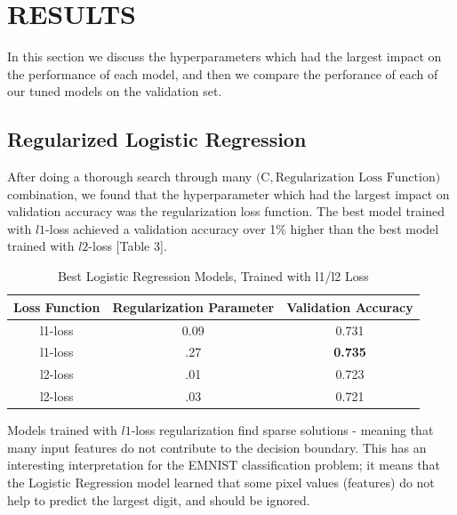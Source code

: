 \documentclass[letterpaper, 10 pt, conference]{ieeeconf}  %
\begin{document}
\section{RESULTS}

In this section we discuss the hyperparameters which had the largest impact on the performance of each model, and then we compare the perforance of each of our tuned models on the validation set. 

\subsection{Regularized Logistic Regression} 

After doing a thorough search through many $\big(\text{C}, \text{Regularization Loss Function}\big)$ combination, we found that the hyperparameter which had the largest impact on validation accuracy was the regularization loss function. The best model trained with $l1$-loss achieved a validation accuracy over 1\% higher than the best model trained with $l2$-loss [Table 3].

\begin{table}[H]
\centering
\caption{Best Logistic Regression Models, Trained with l1/l2 Loss}
\label{my-}
\begin{tabular}{|c|c|c|}
\hline
\textbf{Loss Function} & \textbf{Regularization Parameter} & \textbf{Validation Accuracy} \\ \hline
l1-loss                & 0.09                              & 0.731                        \\ \hline
l1-loss                & .27                               & \textbf{0.735}               \\ \hline
l2-loss                & .01                               & 0.723                        \\ \hline
l2-loss                & .03                               & 0.721                        \\ \hline
\end{tabular}
\end{table}

Models trained with $l1$-loss regularization find sparse solutions - meaning that many input features do not contribute to the decision boundary. This has an interesting interpretation for the EMNIST classification problem; it means that the Logistic Regression model learned that some pixel values (features) do not help to predict the largest digit, and should be ignored.
\end{document}
